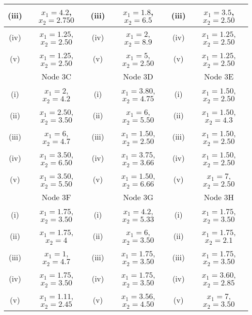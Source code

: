 \documentclass[a4paper,12pt]{article}
\begin{document}
\begin{tabular}{||c|c||c|c||c|c||}
		\hline (iii) & $x_1= 4.2$, $x_2= 2.750$  & (iii) & $x_1= 1.8$, $x_2 =6.5 $ &(iii) & $x_1= 3.5$, $x_2= 2.50$ \\  \hline
		\hline (iv)  & $x_1= 1.25$, $x_2= 2.50$  & (iv) & $x_1= 2$, $x_2 = 8.9$ & (iv)  & $x_1= 1.25$, $x_2= 2.50$\\  \hline
		\hline (v) & $x_1= 1.25$, $x_2= 2.50$ & (v) & $x_1= 5 $, $x_2= 2.50$  &(v) & $x_1= 1.25$, $x_2= 2.50$\\  \hline
		\hline 
		\hline  & Node 3C &   & Node 3D &  & Node 3E  \\  \hline
		\hline (i) & $x_1= 2 $, $x_2 = 4.2$ & (i) & $x_1= 3.80$, $x_2 = 4.75$ &  (i)  & $x_1= 1.50$, $x_2= 2.50$\\  \hline
		\hline (ii)  & $x_1= 2.50$, $x_2 = 3.50 $  & (ii)   & $x_1= 6 $, $x_2= 5.50$ & (ii) & $x_1= 1.50$, $x_2 = 4.3$ \\  \hline
		\hline (iii) & $x_1= 6$, $x_2 = 4.7 $  & (iii) & $x_1= 1.50$, $x_2= 2.50$ &(iii) & $x_1= 1.50$, $x_2= 2.50$ \\  \hline
		\hline (iv)  & $x_1= 3.50$, $x_2= 6.50$  & (iv)  & $x_1= 3.75$, $x_2= 3.66$ & (iv)  & $x_1= 1.50$, $x_2= 2.50$\\  \hline
		\hline (v) & $x_1= 3.50$, $x_2= 5.50$ & (v)   & $x_1= 1.50$, $x_2 = 6.66$  &(v) & $x_1= 7$, $x_2= 2.50$\\  \hline
		\hline 
		\hline  &  Node 3F &  & Node 3G &   & Node 3H \\  \hline
		\hline (i) & $x_1= 1.75$, $x_2= 3.50$ & (i) & $x_1= 4.2$, $x_2 = 5.33$  & (i)  & $x_1= 1.75$, $x_2= 3.50$\\  \hline
		\hline (ii)  & $x_1= 1.75$, $x_2 = 4$  & (ii) & $x_1= 6 $, $x_2= 3.50$ & (ii) & $x_1= 1.75$, $x_2 = 2.1$ \\  \hline
		\hline (iii) & $x_1= 1$, $x_2 = 4.7 $   & (iii) & $x_1= 1.75$, $x_2= 3.50$ &(iii) & $x_1= 1.75$, $x_2= 3.50$ \\  \hline
		\hline (iv)  & $x_1= 1.75$, $x_2= 3.50$  & (iv) & $x_1= 1.75$, $x_2= 3.50$ & (iv)  & $x_1= 3.60 $, $x_2 = 2.85$\\  \hline
		\hline (v) & $x_1= 1.11$, $x_2 = 2.45$ & (v)  & $x_1= 3.56$, $x_2 = 4.50 $ & (v) & $x_1= 7$, $x_2= 3.50$\\  \hline
		\hline 
		
	\end{tabular} 
\end{document}

